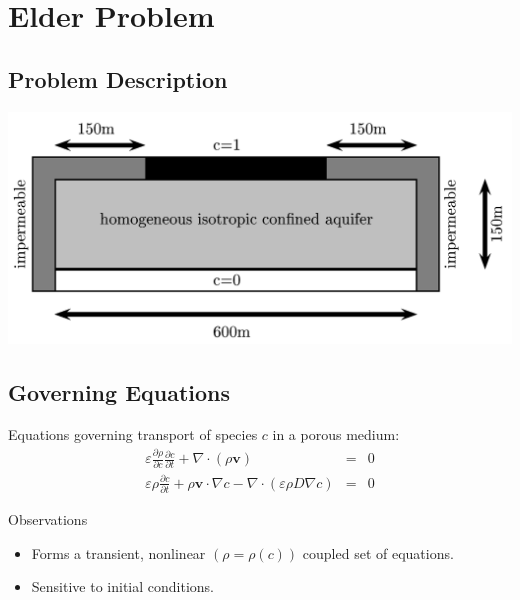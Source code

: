 \documentclass[compress,12pt]{beamer}
\newcommand{\bv}[1]{{\boldsymbol{#1}}}
\begin{document}
\section{Elder Problem}

\subsection{Problem Description}
\begin{frame}
  \centerline{\includegraphics[width=\textwidth]{figures/elder}}
\end{frame}




\subsection{Governing Equations}
\begin{frame}
  Equations governing transport of species $c$ in a porous medium:
  \begin{eqnarray}
    \nonumber
    \varepsilon \frac{\partial \rho}{\partial c}\frac{\partial c}{\partial t} + \nabla \cdot
    \left( \rho \bv{v} \right) &=&0 \\
    \nonumber
    \varepsilon \rho \frac{\partial c}{\partial t} + \rho \bv{v} \cdot \nabla c
    - \nabla \cdot \left( \varepsilon \rho D \nabla c
    \right) &=&0 
  \end{eqnarray}


  \small
  Observations
  \begin{itemize}
    
    \item Forms a transient, nonlinear $\left(\rho = \rho\left(c\right)\right)$ coupled set of equations.
    \item Sensitive to initial conditions.
  \end{itemize}
  \normalsize
\end{frame}
\end{document}
